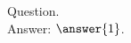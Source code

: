 \documentclass{ximera}
\author{Lee Wayand}
\begin{document}
\begin{exercise}

Question. \\
Answer: $\answer{1}$.



\end{exercise}
\end{document}
